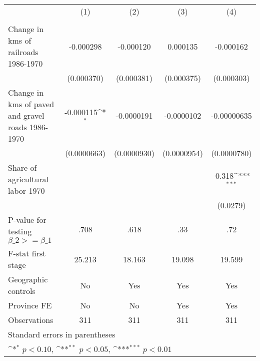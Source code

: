 {
\def\sym#1{\ifmmode^{#1}\else\(^{#1}\)\fi}
\begin{tabular}{l*{4}{c}}
\hline\hline
                &\multicolumn{1}{c}{(1)}&\multicolumn{1}{c}{(2)}&\multicolumn{1}{c}{(3)}&\multicolumn{1}{c}{(4)}\\
                &\multicolumn{1}{c}{}&\multicolumn{1}{c}{}&\multicolumn{1}{c}{}&\multicolumn{1}{c}{}\\
\hline
Change in kms of railroads 1986-1970&-0.000298         &-0.000120         & 0.000135         &-0.000162         \\
                &(0.000370)         &(0.000381)         &(0.000375)         &(0.000303)         \\
[1em]
Change in kms of paved and gravel roads 1986-1970&-0.000115\sym{*}  &-0.0000191         &-0.0000102         &-0.00000635         \\
                &(0.0000663)         &(0.0000930)         &(0.0000954)         &(0.0000780)         \\
[1em]
Share of agricultural labor 1970&                  &                  &                  &   -0.318\sym{***}\\
                &                  &                  &                  & (0.0279)         \\
\hline
P-value for testing $\beta\_{2} >= \beta\_{1}$&     .708         &     .618         &      .33         &      .72         \\
F-stat first stage&   25.213         &   18.163         &   19.098         &   19.599         \\
Geographic controls&       No         &      Yes         &      Yes         &      Yes         \\
Province FE     &       No         &       No         &      Yes         &      Yes         \\
Observations    &      311         &      311         &      311         &      311         \\
\hline\hline
\multicolumn{5}{l}{\footnotesize Standard errors in parentheses}\\
\multicolumn{5}{l}{\footnotesize \sym{*} \(p<0.10\), \sym{**} \(p<0.05\), \sym{***} \(p<0.01\)}\\
\end{tabular}
}
